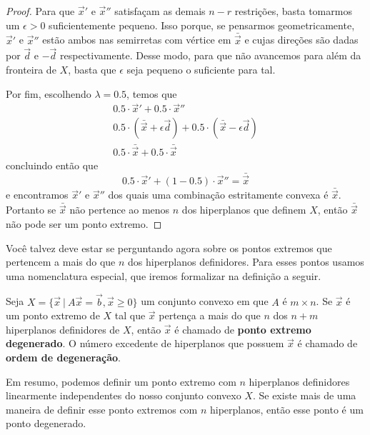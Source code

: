 \begin{thm:ponto extremo}
\begin{proof}
		Para que $\vec{x}'$ e $\vec{x}''$ satisfaçam as demais $n - r$ restrições, basta tomarmos um $\epsilon > 0$ suficientemente pequeno. Isso porque, se pensarmos geometricamente,  $\vec{x}'$ e $\vec{x}''$ estão ambos nas semirretas com vértice em $\bar{\vec{x}}$ e cujas direções são dadas por $\vec{d}$ e $-\vec{d}$ respectivamente. Desse modo, para que não avancemos para além da fronteira de $X$, basta que $\epsilon$ seja pequeno o suficiente para tal.
		
		Por fim, escolhendo $\lambda = 0.5$, temos que
		\begin{gather*}
			0.5 \cdot \vec{x}' + 0.5 \cdot \vec{x}'' \\
			0.5 \cdot (\bar{\vec{x}} + \epsilon \vec{d}) +
			0.5 \cdot (\bar{\vec{x}} - \epsilon \vec{d}) \\
			0.5 \cdot \bar{\vec{x}} + 0.5 \cdot \bar{\vec{x}} 			
		\end{gather*}
		concluindo então que
		\begin{equation*}
			0.5 \cdot \vec{x}' + (1 - 0.5) \cdot \vec{x}'' = \bar{\vec{x}}
		\end{equation*}
		e encontramos $\vec{x}'$ e $\vec{x}''$ dos quais uma combinação estritamente convexa é $\bar{\vec{x}}$. Portanto se $\bar{\vec{x}}$ não pertence ao menos $n$ dos hiperplanos que definem $X$, então $\bar{\vec{x}}$ não pode ser um ponto extremo. 
	\end{proof}
\end{thm:ponto extremo}

Você talvez deve estar se perguntando agora sobre os pontos extremos que pertencem a mais do que $n$ dos hiperplanos definidores. Para esses pontos usamos uma nomenclatura especial, que iremos formalizar na definição a seguir.

\begin{def:ponto degenerado}
	Seja $X = \{\vec{x}\ |\ A\vec{x} = \vec{b}, \vec{x} \geq 0\}$ um conjunto convexo em que $A$ é $m \times n$. Se $\vec{x}$ é um ponto extremo de $X$ tal que $\vec{x}$ pertença a mais do que $n$ dos $n + m$ hiperplanos definidores de $X$, então $\vec{x}$ é chamado de \textbf{ponto extremo degenerado}. O número excedente de hiperplanos que possuem $\vec{x}$ é chamado de \textbf{ordem de degeneração}.
\end{def:ponto degenerado}

Em resumo, podemos definir um ponto extremo com $n$ hiperplanos definidores linearmente independentes do nosso conjunto convexo $X$. Se existe mais de uma maneira de definir esse ponto extremos com $n$ hiperplanos, então esse ponto é um ponto degenerado.

